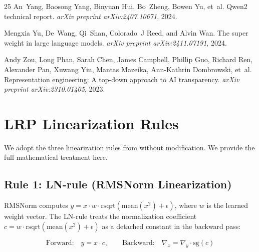 \documentclass[11pt]{article}
\begin{document}
\begin{thebibliography}{25}
An~Yang, Baosong Yang, Binyuan Hui, Bo~Zheng, Bowen Yu, et~al.
\newblock Qwen2 technical report.
\newblock \emph{arXiv preprint arXiv:2407.10671}, 2024.

Mengxia Yu, De~Wang, Qi~Shan, Colorado~J Reed, and Alvin Wan.
\newblock The super weight in large language models.
\newblock \emph{arXiv preprint arXiv:2411.07191}, 2024.

Andy Zou, Long Phan, Sarah Chen, James Campbell, Phillip Guo, Richard Ren,
  Alexander Pan, Xuwang Yin, Mantas Mazeika, Ann-Kathrin Dombrowski, et~al.
\newblock Representation engineering: A top-down approach to {AI} transparency.
\newblock \emph{arXiv preprint arXiv:2310.01405}, 2023.

\end{thebibliography}


\newpage

\appendix

\section{LRP Linearization Rules}
\label{sec:lrp_appendix}

We adopt the three linearization rules from \citet{arora2025circuits} without modification.
We provide the full mathematical treatment here.

\subsection{Rule 1: LN-rule (RMSNorm Linearization)}

RMSNorm computes $y = x \cdot w \cdot \text{rsqrt}(\text{mean}(x^2) + \epsilon)$, where $w$ is the learned weight vector.
The LN-rule treats the normalization coefficient $c = w \cdot \text{rsqrt}(\text{mean}(x^2) + \epsilon)$ as a detached constant in the backward pass:

\begin{equation}
    \text{Forward:} \quad y = x \cdot c, \qquad
    \text{Backward:} \quad \nabla_x = \nabla_y \cdot \text{sg}(c)
\label{eq:ln_rule}
\end{equation}
\end{document}
